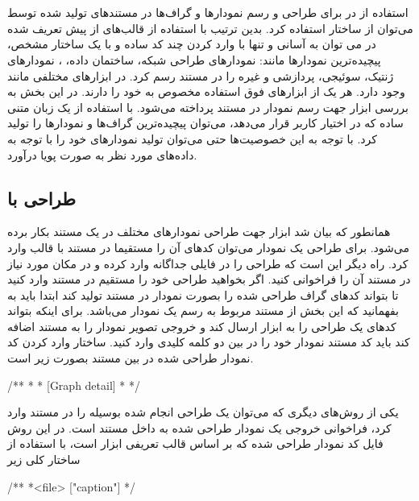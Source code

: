 % 
% 
% 
%

\section{}
استفاده از  در  
برای طراحی و رسم نمودارها و گراف‌ها در مستندهای تولید شده توسط  می‌توان از ساختار  استفاده کرد. بدین ترتیب با استفاده از قالب‌های از پیش تعریف شده در  می توان به آسانی و تنها با وارد کردن چند کد ساده و با یک  ساختار مشخص، پیچیده‌ترین نمودارها مانند: نمودارهای طراحی شبکه، ساختمان داده،  ، نمودارهای ژنتیک، سوئیجی، پردازشی و غیره را در مستند رسم کرد.
در  ابزارهای مختلفی مانند  وجود دارد. هر یک از ابزارهای فوق استفاده مخصوص به خود را دارند. در این بخش به بررسی ابزار  جهت رسم نمودار در مستند پرداخته می‌شود. با استفاده از یک زبان متنی ساده که  در اختیار کاربر قرار می‌دهد، می‌توان پیچیده‌ترین گراف‌ها و نمودارها را تولید کرد. با توجه به این خصوصیت‌ها حتی می‌توان تولید نمودارهای خود را با توجه به داده‌های مورد نظر به صورت پویا درآورد.

\subsection{طراحی با }
همانطور که بیان شد ابزار  جهت طراحی نمودارهای مختلف در یک مستند بکار برده می‌شود. برای طراحی یک نمودار می‌توان کدهای آن را مستقیما در مستند با قالب  وارد کرد. راه دیگر این است که طراحی را در فایلی جداگانه وارد کرده و در مکان مورد نیاز در مستند آن را فراخوانی کنید.
اگر بخواهید طراحی خود را مستقیم در مستند وارد کنید تا  بتواند کدهای گراف طراحی شده را بصورت نمودار در مستند تولید کند ابتدا باید به  بفهمانید که این بخش از مستند مربوط به رسم یک نمودار می‌باشد. برای اینکه  بتواند کدهای یک طراحی را به ابزار  ارسال کند و خروجی تصویر نمودار را به مستند اضافه کند باید کد مستند نمودار خود را در بین دو کلمه کلیدی
وارد کنید. ساختار وارد کردن کد نمودار طراحی شده در بین مستند بصورت زیر است.
\begin{C++}
/**
 * \dot
 * [Graph detail]
 * \enddot
 */
\end{C++}

یکی از روش‌های دیگری که می‌توان یک طراحی انجام شده بوسیله  را در مستند وارد کرد، فراخوانی خروجی یک نمودار طراحی شده به داخل مستند است. در این روش فایل کد نمودار طراحی شده که بر اساس قالب تعریفی ابزار  است، با استفاده از ساختار کلی زیر
\begin{C++}
/**
 *\dotfile <file> ["caption"]
 */
\end{C++}

